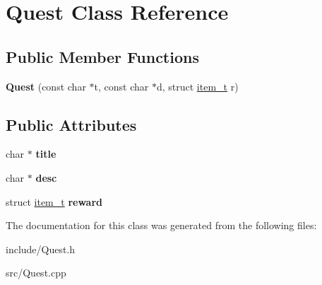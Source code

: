 \hypertarget{classQuest}{}\section{Quest Class Reference}
\label{classQuest}
\subsection*{Public Member Functions}
\begin{DoxyCompactItemize}
\item 
\hypertarget{classQuest_a39ce0527d8b287a38d136ac065b4e5a6}{}{\bfseries Quest} (const char $\ast$t, const char $\ast$d, struct \hyperlink{structitem__t}{item\+\_\+t} r)\label{classQuest_a39ce0527d8b287a38d136ac065b4e5a6}

\end{DoxyCompactItemize}
\subsection*{Public Attributes}
\begin{DoxyCompactItemize}
\item 
\hypertarget{classQuest_a4beb162692ae1c6f6671534ba41caeaf}{}char $\ast$ {\bfseries title}\label{classQuest_a4beb162692ae1c6f6671534ba41caeaf}

\item 
\hypertarget{classQuest_a3a846582fcef1a800d3795cf1077c95e}{}char $\ast$ {\bfseries desc}\label{classQuest_a3a846582fcef1a800d3795cf1077c95e}

\item 
\hypertarget{classQuest_a188d942f0e5c39771aa1d23b61c0e6c0}{}struct \hyperlink{structitem__t}{item\+\_\+t} {\bfseries reward}\label{classQuest_a188d942f0e5c39771aa1d23b61c0e6c0}

\end{DoxyCompactItemize}


The documentation for this class was generated from the following files\+:\begin{DoxyCompactItemize}
\item 
include/Quest.\+h\item 
src/Quest.\+cpp\end{DoxyCompactItemize}
